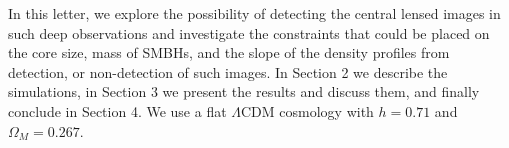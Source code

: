 \documentclass[chicago]{emulateapj}
\begin{document}

 In this letter, we explore the possibility of detecting the central lensed images in such deep observations and investigate the constraints that could be placed on the core size, mass of SMBHs, and the slope of the density profiles from detection, or non-detection of such images. In Section 2 we describe the simulations, in Section 3 we present the results and discuss them, and finally conclude in Section 4. We use a flat $\Lambda$CDM cosmology with $h=0.71$ and $\Omega_M=0.267$.
 
\end{document}
